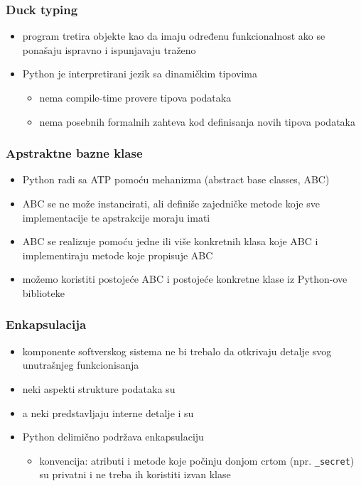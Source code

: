 \documentclass[compress,aspectratio=169]{beamer}
\begin{document}
\begin{frame}[fragile]
  \frametitle{Duck typing}
  \begin{itemize}
    \item program tretira objekte kao da imaju određenu funkcionalnost ako se ponašaju ispravno i ispunjavaju traženo
    \item Python je interpretirani jezik sa dinamičkim tipovima
    \begin{itemize}
      \item nema compile-time provere tipova podataka
      \item nema posebnih formalnih zahteva kod definisanja novih tipova podataka
    \end{itemize}
  \end{itemize}
\end{frame}

\begin{frame}[fragile]
  \frametitle{Apstraktne bazne klase}
  \begin{itemize}
    \item Python radi sa ATP pomoću mehanizma  (abstract base classes, ABC)
    \item ABC se ne može instancirati, ali definiše zajedničke metode koje sve implementacije te apstrakcije moraju imati
    \item ABC se realizuje pomoću jedne ili više konkretnih klasa koje  ABC i implementiraju metode koje propisuje ABC
    \item možemo koristiti postojeće ABC i postojeće konkretne klase iz Python-ove biblioteke 
  \end{itemize}
\end{frame}

\begin{frame}[fragile]
  \frametitle{Enkapsulacija}
  \begin{itemize}
    \item komponente softverskog sistema ne bi trebalo da otkrivaju detalje svog unutrašnjeg funkcionisanja
    \item neki aspekti strukture podataka su 
    \item a neki predstavljaju interne detalje i  su
    \item Python delimično podržava enkapsulaciju 
    \begin{itemize}
      \item konvencija: atributi i metode koje počinju donjom crtom (npr. \texttt{\_secret}) su privatni i ne treba ih koristiti izvan klase 
    \end{itemize}
  \end{itemize}
\end{frame}
\end{document}
